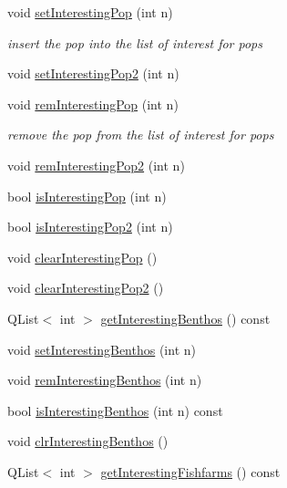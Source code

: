 \begin{DoxyCompactItemize}
\item 
void \mbox{\hyperlink{class_displace_model_ab1f5d05b68eba34d7aa680e840829b2a}{set\+Interesting\+Pop}} (int n)
\begin{DoxyCompactList}\small\item\em insert the pop into the list of interest for pops \end{DoxyCompactList}\item 
void \mbox{\hyperlink{class_displace_model_a7bd445e07f5ff0cc06dc533edee7d9b1}{set\+Interesting\+Pop2}} (int n)
\item 
void \mbox{\hyperlink{class_displace_model_a7e4d9fc5fcfe94a705de61e3e75263de}{rem\+Interesting\+Pop}} (int n)
\begin{DoxyCompactList}\small\item\em remove the pop from the list of interest for pops \end{DoxyCompactList}\item 
void \mbox{\hyperlink{class_displace_model_aef4e9af286d63040df76351a6ba01e0e}{rem\+Interesting\+Pop2}} (int n)
\item 
bool \mbox{\hyperlink{class_displace_model_ab7b796caabd03c253520aa8fa1723355}{is\+Interesting\+Pop}} (int n)
\item 
bool \mbox{\hyperlink{class_displace_model_a4143fb6526f704e0332e9e73e6a2ba43}{is\+Interesting\+Pop2}} (int n)
\item 
void \mbox{\hyperlink{class_displace_model_a9c20536494a366da712fe77dce1b45ce}{clear\+Interesting\+Pop}} ()
\item 
void \mbox{\hyperlink{class_displace_model_a4892c79bb8d9b3a71c476b43f18ebe67}{clear\+Interesting\+Pop2}} ()
\item 
Q\+List$<$ int $>$ \mbox{\hyperlink{class_displace_model_ab3c7e95ad349e79201a9aacc13d9e159}{get\+Interesting\+Benthos}} () const
\item 
void \mbox{\hyperlink{class_displace_model_ae1ba23a9b4338e94af73a8414326483c}{set\+Interesting\+Benthos}} (int n)
\item 
void \mbox{\hyperlink{class_displace_model_a7d73e21cba3168e1549d234724e09a63}{rem\+Interesting\+Benthos}} (int n)
\item 
bool \mbox{\hyperlink{class_displace_model_a6c80f60352add730ba0c0fd49e000ed7}{is\+Interesting\+Benthos}} (int n) const
\item 
void \mbox{\hyperlink{class_displace_model_aa6bbf846936d868c7bf3f91a44109a06}{clr\+Interesting\+Benthos}} ()
\item 
Q\+List$<$ int $>$ \mbox{\hyperlink{class_displace_model_a45fc7c517563385fe54375a6422a32b7}{get\+Interesting\+Fishfarms}} () const

\end{DoxyCompactItemize}
